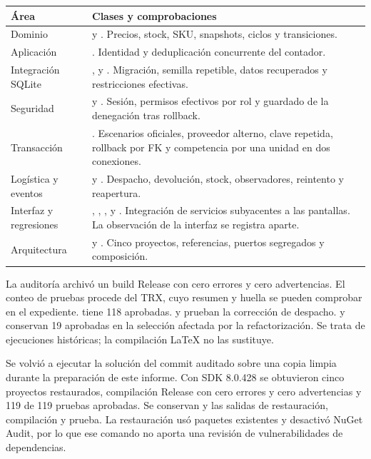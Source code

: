 \begin{longtable}{@{}L{.22\linewidth}L{.73\linewidth}@{}}
\toprule Área & Clases y comprobaciones \\ \midrule\endhead
Dominio &  y . Precios, stock, SKU, snapshots, ciclos y transiciones. \\
Aplicación & . Identidad y deduplicación concurrente del contador. \\
Integración SQLite & ,  y . Migración, semilla repetible, datos recuperados y restricciones efectivas. \\
Seguridad &  y . Sesión, permisos efectivos por rol y guardado de la denegación tras rollback. \\
Transacción & . Escenarios oficiales, proveedor alterno, clave repetida, rollback por FK y competencia por una unidad en dos conexiones. \\
Logística y eventos &  y . Despacho, devolución, stock, observadores, reintento y reapertura. \\
Interfaz y regresiones & , , ,  y . Integración de servicios subyacentes a las pantallas. La observación de la interfaz se registra aparte. \\
Arquitectura &  y . Cinco proyectos, referencias, puertos segregados y composición. \\
\bottomrule
\end{longtable}

La auditoría archivó un build Release con cero errores y cero advertencias. El conteo de pruebas procede del TRX, cuyo resumen y huella se pueden comprobar en el expediente.  tiene 118 aprobadas.  y  prueban la corrección de despacho.  y  conservan 19 aprobadas en la selección afectada por la refactorización. Se trata de ejecuciones históricas; la compilación LaTeX no las sustituye.

Se volvió a ejecutar la solución del commit auditado sobre una copia limpia durante la preparación de este informe. Con SDK 8.0.428 se obtuvieron cinco proyectos restaurados, compilación Release con cero errores y cero advertencias y 119 de 119 pruebas aprobadas. Se conservan  y las salidas de restauración, compilación y prueba. La restauración usó paquetes existentes y desactivó NuGet Audit, por lo que ese comando no aporta una revisión de vulnerabilidades de dependencias.

